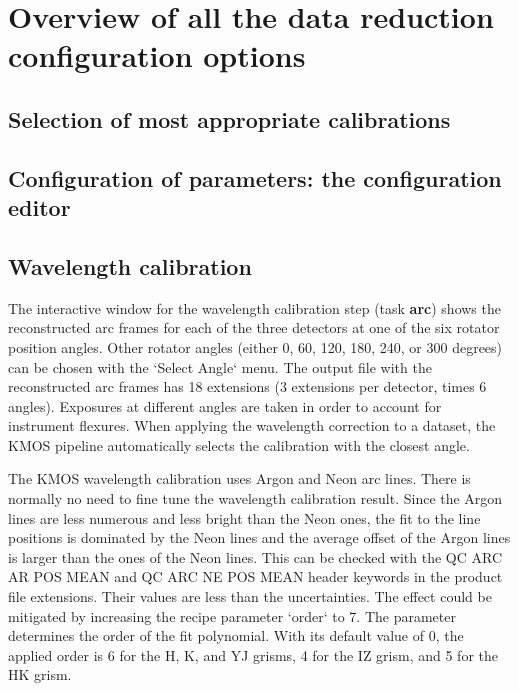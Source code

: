 \section{Overview of all the data reduction configuration options}
\label{sec:configuretion_overview}

\subsection{Selection of most appropriate calibrations}



\subsection{Configuration of parameters: the configuration editor}
\label{sec:configuration_editor}



\subsection{Wavelength calibration}

The interactive window for the wavelength calibration step (task \textbf{arc}) shows the 
reconstructed arc frames for each of
the three detectors at one of the six rotator position angles. 
Other rotator angles (either 0, 60, 120, 180, 240, or 300 degrees) can be chosen with the
`Select Angle` menu. The
output file with the reconstructed arc frames has 18 extensions (3 extensions per detector, times 6 angles).
Exposures at different angles are taken in order to account for instrument flexures. When applying the wavelength
correction to a dataset, the KMOS pipeline automatically selects the calibration with the closest angle. 

The KMOS wavelength calibration uses Argon and Neon arc lines. 
There is normally no need to fine tune the wavelength calibration result. 
Since the Argon lines are less numerous and
less bright than the Neon ones, the fit to the line positions is dominated by the Neon lines and
the average offset of the Argon lines is larger than the ones of the Neon lines. This can be checked with the
QC ARC AR POS MEAN and QC ARC NE POS MEAN header keywords in the product file extensions. Their values are
less than the uncertainties. The effect could be mitigated by increasing the recipe parameter `order` to 7.
The parameter determines the order of the fit polynomial.
With its default value of 0, the applied order is 6 for the H, K, and YJ grisms, 4 for the IZ grism, and
5 for the HK grism. 

